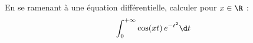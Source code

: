 \begin{enonce}
\begin{exercise}[ID={RMS135 E1479},subtitle={IMT MP 2024},tags={},difficulty={}]

En se ramenant à une équation différentielle, calculer pour $x \in \R$ :
\begin{equation*}
\int_0^{+\infty} \cos(xt) \, e^{-t^2} \d t
\end{equation*}
\end{exercise}
\begin{solution}
\end{solution}
\end{enonce}
